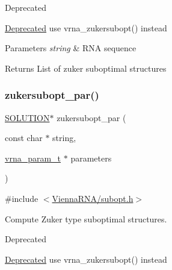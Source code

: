 \begin{DoxyRefDesc}{Deprecated}
\item[\hyperlink{deprecated__deprecated000152}{Deprecated}]use vrna\+\_\+zukersubopt() instead\end{DoxyRefDesc}



\begin{DoxyParams}{Parameters}
{\em string} & R\+NA sequence \\
\hline
\end{DoxyParams}
\begin{DoxyReturn}{Returns}
List of zuker suboptimal structures 
\end{DoxyReturn}
\mbox{\label{group__subopt__zuker_gab6d0ea8cc1d02f6dd831ca81043c9eb8}} 
\subsubsection{\texorpdfstring{zukersubopt\+\_\+par()}{zukersubopt\_par()}}
{\footnotesize\ttfamily \hyperlink{subopt_8h_aa0f46ff02e1017469cf902d02ecd7f9a}{S\+O\+L\+U\+T\+I\+ON}$\ast$ zukersubopt\+\_\+par (\begin{DoxyParamCaption}\item[{const char $\ast$}]{string,  }\item[{\hyperlink{group__energy__parameters_ga8a69ca7d787e4fd6079914f5343a1f35}{vrna\+\_\+param\+\_\+t} $\ast$}]{parameters }\end{DoxyParamCaption})}



{\ttfamily \#include $<$\hyperlink{subopt_8h}{Vienna\+R\+N\+A/subopt.\+h}$>$}



Compute Zuker type suboptimal structures. 

\begin{DoxyRefDesc}{Deprecated}
\item[\hyperlink{deprecated__deprecated000153}{Deprecated}]use vrna\+\_\+zukersubopt() instead\end{DoxyRefDesc}
